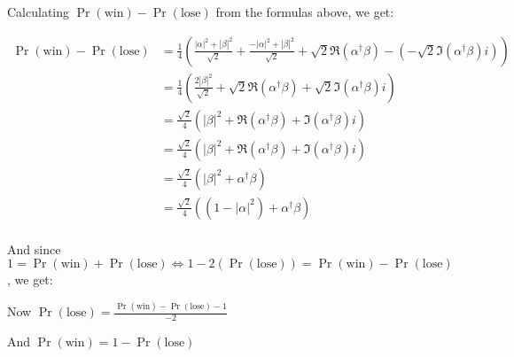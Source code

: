 \documentclass{article}
\newcommand{\abs}[1]{\left\lvert #1 \right\rvert}
\begin{document}
\begin{enumerate}
\begin{enumerate}
                Calculating $\Pr(\text{win})-\Pr(\text{lose})$ from the formulas above, we get:

                $$\begin{aligned}
                    \Pr(\text{win})-\Pr(\text{lose}) & = \frac{1}{4}\left(\frac{\abs{\alpha}^2+\abs{\beta}^2}{\sqrt{2}}+\frac{-\abs{\alpha}^2+\abs{\beta}^2}{\sqrt{2}}+\sqrt{2}\Re(\alpha^\dagger\beta)-(-\sqrt{2}\Im(\alpha^\dagger\beta)i)\right) \\
                                                     & = \frac{1}{4}\left(\frac{2\abs{\beta}^2}{\sqrt{2}}+\sqrt{2}\Re(\alpha^\dagger\beta)+\sqrt{2}\Im(\alpha^\dagger\beta)i\right)                                                                 \\
                                                     & = \frac{\sqrt{2}}{4}\left(\abs{\beta}^2+\Re(\alpha^\dagger\beta)+\Im(\alpha^\dagger\beta)i\right)                                                                                            \\
                                                     & = \frac{\sqrt{2}}{4}\left(\abs{\beta}^2+\Re(\alpha^\dagger\beta)+\Im(\alpha^\dagger\beta)i\right)                                                                                            \\
                                                     & = \frac{\sqrt{2}}{4}\left(\abs{\beta}^2+\alpha^\dagger\beta\right)                                                                                                                           \\
                                                     & = \frac{\sqrt{2}}{4}\left((1-\abs{\alpha}^2)+\alpha^\dagger\beta\right)                                                                                                                      \\
                  \end{aligned}$$

                And since $1=\Pr(\text{win})+\Pr(\text{lose})\iff 1-2(\Pr(\text{lose}))=\Pr(\text{win})-\Pr(\text{lose})$, we get:

                Now $\Pr(\text{lose})=\frac{\Pr(\text{win})-\Pr(\text{lose})-1}{-2}$

                And $\Pr(\text{win})=1-\Pr(\text{lose})$


\end{enumerate}
\end{enumerate}
\end{document}
